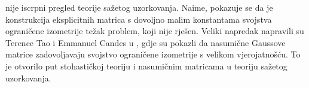 \documentclass[a4paper,twoside,12pt]{memoir} %
\begin{document}
\begin{sazetak}
nije iscrpni pregled teorije sa\v{z}etog uzorkovanja. Naime, pokazuje se da je konstrukcija eksplicitnih matrica s dovoljno malim konstantama svojstva ograni\v{c}ene izometrije te\v{z}ak problem, koji nije rje\v{s}en. Veliki napredak napravili su Terence Tao i Emmanuel Candes u \cite{CandesTao}, gdje su pokazli da nasumi\v{c}ne Gaussove matrice zadovoljavaju svojstvo ograni\v{c}ene izometrije s velikom vjerojatno\v{s}\'cu. To je otvorilo put stohasti\v{c}koj teoriju i nasumi\v{c}nim matricama u teoriju sa\v{z}etog uzorkovanja.
\end{sazetak}

\begin{summary}
\end{summary}


\begin{cv}
\end{cv}
\end{document}
